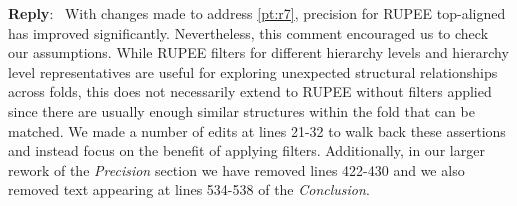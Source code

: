 \documentclass[11pt]{article}
\newcounter{reviewer}
\newcounter{point}[reviewer]
\renewcommand{\thepoint}{P\,\thereviewer.\arabic{point}}
\newcommand{\shortpoint}[1]{\refstepcounter{point}  \bigskip \noindent 
	{\textbf{Reviewer~Point~\thepoint} } ---~#1\par }
\newenvironment{reply}
   {\medskip \noindent \begin{sf}\textbf{Reply}:\  }
   {\medskip \end{sf}}
\newcommand{\shortreply}[2][]{\medskip \noindent \begin{sf}\textbf{Reply}:\  #2
	\ifthenelse{\equal{#1}{}}{}{ \hfill \footnotesize (#1)}%
	\medskip \end{sf}}
\begin{document}
\begin{reply}
With changes made to address \ref{pt:r7}, precision for RUPEE top-aligned has improved significantly. 
Nevertheless, this comment encouraged us to check our assumptions.
While RUPEE filters for different hierarchy levels and hierarchy level representatives are useful for exploring unexpected structural relationships across folds, this does not necessarily extend to RUPEE without filters applied since there are usually enough similar structures within the fold that can be matched. 
We made a number of edits at lines 21-32 to walk back these assertions and instead focus on the benefit of applying filters.
Additionally, in our larger rework of the \emph{Precision} section we have removed lines 422-430 and we also removed text appearing at lines 534-538 of the \emph{Conclusion}.
\end{reply}




\end{document}
